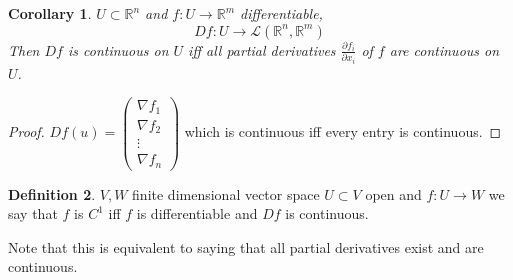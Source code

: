 \documentclass[11pt,a4paper]{article}
\theoremstyle{definition}
\newtheorem{definition}{Definition}[section]
\theoremstyle{plain}
\newtheorem{corollary}[definition]{Corollary}
\theoremstyle{remark}
\newcommand{\R}{\mathbb{R}}
\begin{document}
\begin{corollary}
    $U \subset \R^n$ and $f \colon U \to \R^m$ differentiable, 
    $$Df \colon U \to \mathcal{L} (\R^n , \R^m)$$
    Then $Df$ is continuous on $U$ iff all partial derivatives $\frac{\partial f_i}{\partial x_i}$ of $f$ are continuous on $U$. 
\end{corollary}

\begin{proof}
    $Df(u) = \begin{pmatrix}
        \nabla f_1 \\ \nabla f_2 \\ \vdots \\ \nabla f_n
    \end{pmatrix}$ which is continuous iff every entry is continuous.
\end{proof}

\begin{definition}
    $V,W$ finite dimensional vector space $U \subset V$ open and $f \colon U \to W$ we say that $f$ is $C^1$ iff $f$ is differentiable and $Df$ is continuous. 

    Note that this is equivalent to saying that all partial derivatives exist and are continuous.
\end{definition}
\end{document}
